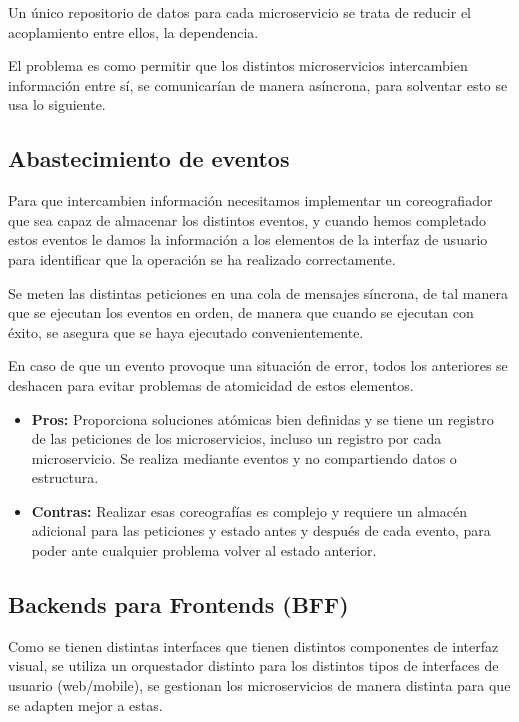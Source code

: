 \documentclass[12pt, twoside, openright]{report} %
\begin{document}
Un único repositorio de datos para cada microservicio se trata de reducir el acoplamiento entre ellos, la dependencia.

El problema es como permitir que los distintos microservicios intercambien información entre sí, se comunicarían de manera asíncrona, para solventar esto se usa lo siguiente.

\subsection{Abastecimiento de eventos}

Para que intercambien información necesitamos implementar un coreografiador que sea capaz de almacenar los distintos eventos, y cuando hemos completado estos eventos le damos la información a los elementos de la interfaz de usuario para identificar que la operación se ha realizado correctamente.

Se meten las distintas peticiones en una cola de mensajes síncrona, de tal manera que se ejecutan los eventos en orden, de manera que cuando se ejecutan con éxito, se asegura que se haya ejecutado convenientemente.

En caso de que un evento provoque una situación de error, todos los anteriores se deshacen para evitar problemas de atomicidad de estos elementos.
\begin{itemize}
	\item \textbf{Pros:} Proporciona soluciones atómicas bien definidas y se tiene un registro de las peticiones de los microservicios, incluso un registro por cada microservicio. Se realiza mediante eventos y no compartiendo datos o estructura.
	\item \textbf{Contras:} Realizar esas coreografías es complejo y requiere un almacén adicional para las peticiones y estado antes y después de cada evento,  para poder ante cualquier problema volver al estado anterior.
\end{itemize}

\subsection{Backends para Frontends (BFF)}

Como se tienen distintas interfaces que tienen distintos componentes de interfaz visual, se utiliza un orquestador distinto para los distintos tipos de interfaces de usuario (web/mobile), se gestionan los microservicios de manera distinta para que se adapten mejor a estas.
\end{document}
